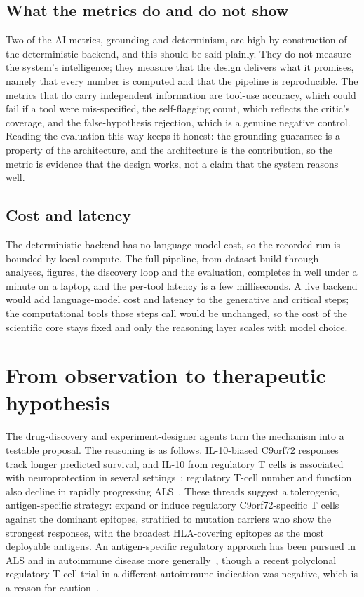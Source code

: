 \documentclass[11pt]{article}
\begin{document}
\subsection{What the metrics do and do not show}
Two of the AI metrics, grounding and determinism, are high by construction of the deterministic
backend, and this should be said plainly. They do not measure the system's intelligence; they
measure that the design delivers what it promises, namely that every number is computed and that the
pipeline is reproducible. The metrics that do carry independent information are tool-use accuracy,
which could fail if a tool were mis-specified, the self-flagging count, which reflects the critic's
coverage, and the false-hypothesis rejection, which is a genuine negative control. Reading the
evaluation this way keeps it honest: the grounding guarantee is a property of the architecture, and
the architecture is the contribution, so the metric is evidence that the design works, not a claim
that the system reasons well.

\subsection{Cost and latency}
The deterministic backend has no language-model cost, so the recorded run is bounded by local
compute. The full pipeline, from dataset build through analyses, figures, the discovery loop and the
evaluation, completes in well under a minute on a laptop, and the per-tool latency is a few
milliseconds. A live backend would add language-model cost and latency to the generative and
critical steps; the computational tools those steps call would be unchanged, so the cost of the
scientific core stays fixed and only the reasoning layer scales with model choice.

\section{From observation to therapeutic hypothesis}\label{sec:therapy}
The drug-discovery and experiment-designer agents turn the mechanism into a testable proposal. The
reasoning is as follows. IL-10-biased C9orf72 responses track longer predicted survival, and IL-10
from regulatory T cells is associated with neuroprotection in several
settings~\citep{runge2020,laffer2019,bido2024}; regulatory T-cell number and function also decline
in rapidly progressing ALS~\citep{appel2012}. These threads suggest a
tolerogenic, antigen-specific strategy: expand or induce regulatory C9orf72-specific T cells against
the dominant epitopes, stratified to mutation carriers who show the strongest responses, with the
broadest HLA-covering epitopes as the most deployable antigens. An antigen-specific regulatory
approach has been pursued in ALS and in autoimmune disease more
generally~\citep{thonhoff2018,nepom2022}, though a recent polyclonal regulatory T-cell trial in a
different autoimmune indication was negative, which is a reason for caution~\citep{al2024}.
\end{document}
